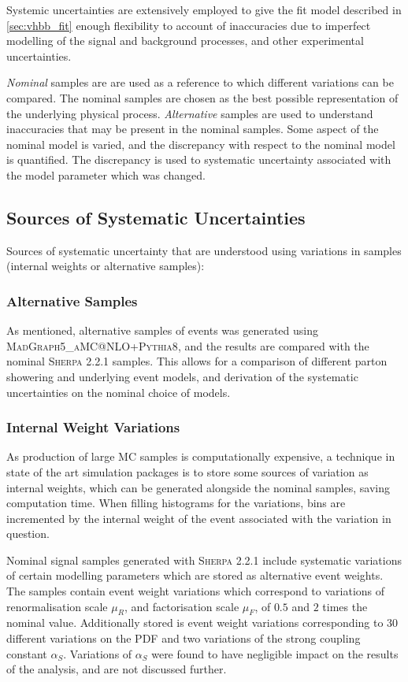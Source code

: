 Systemic uncertainties are extensively employed to give the fit model described in \cref{sec:vhbb_fit} enough flexibility to account of inaccuracies due to imperfect modelling of the signal and background processes, and other experimental uncertainties.

\textit{Nominal} samples are are used as a reference to which different variations can be compared.
The nominal samples are chosen as the best possible representation of the underlying physical process.
\textit{Alternative} samples are used to understand inaccuracies that may be present in the nominal samples.
Some aspect of the nominal model is varied, and the discrepancy with respect to the nominal model is quantified.
The discrepancy is used to systematic uncertainty associated with the model parameter which was changed.

\subsection{Sources of Systematic Uncertainties}

Sources of systematic uncertainty that are understood using variations in samples (internal weights or alternative samples):
%

%
\subsubsection{Alternative Samples}
As mentioned, alternative samples of \Vjets events was generated using \textsc{MadGraph5\_aMC@NLO+Pythia8}, and the results are compared with the nominal \textsc{Sherpa 2.2.1} samples. This allows for a comparison of different parton showering and underlying event models, and derivation of the systematic uncertainties on the nominal choice of models.

\subsubsection{Internal Weight Variations}

As production of large MC samples is computationally expensive, a technique in state of the art simulation packages is to store some sources of variation as internal weights, which can be generated alongside the nominal samples, saving computation time. When filling histograms for the variations, bins are incremented by the internal weight of the event associated with the variation in question.

Nominal signal samples generated with \textsc{Sherpa 2.2.1} include systematic variations of certain modelling parameters which are stored as alternative event weights. The samples contain event weight variations which correspond to variations of renormalisation scale $\mu_R$, and factorisation scale $\mu_F$, of $0.5$ and $2$ times the nominal value. Additionally stored is event weight variations corresponding to $30$ different variations on the PDF and two variations of the strong coupling constant $\alpha_S$. Variations of $\alpha_S$ were found to have negligible impact on the results of the analysis, and are not discussed further. 

